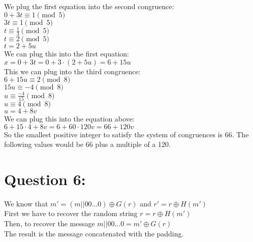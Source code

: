 \documentclass{article}
\begin{document}
\noindent
We plug the first equation into the second congruence:
\\
\noindent
$0 + 3t \equiv 1 \pmod 5$ \\
$3t \equiv 1 \pmod 5$ \\
$t \equiv \frac{1}{3} \pmod 5$ \\
$t \equiv 2 \pmod 5$ \\
$t = 2 + 5u$\\

\noindent
We can plug this into the first equation:
\\
\noindent
$ x = 0 + 3t = 0 + 3 \cdot (2 + 5u) = 6 + 15u $ \\

\noindent
This we can plug into the third congruence:\\
\noindent
$6 + 15u \equiv 2 \pmod 8$ \\
$15u \equiv -4 \pmod 8$ \\
$u \equiv \frac{-4}{15} \pmod 8$ \\
$u \equiv 4 \pmod 8$ \\
$u = 4 + 8v$ \\

\noindent
We can plug this into the equation above: \\

$6 + 15 \cdot 4 + 8v = 6 + 60 \cdot 120v = 66 + 120v$\\

\noindent
So the smallest positive integer to satisfy the system of congruences is 66. The following values would be 66 plus a multiple of a 120.

\section{Question 6:}

We know that $m' = (m || 00...0) \oplus G(r)$ and $r' = r \oplus H(m')$
\\
First we have to recover the random string $r = r \oplus H(m')$
\\
Then, to recover the message $m || 00...0 = m' \oplus G(r)$
\\
The result is the message concatenated with the padding.
\end{document}

